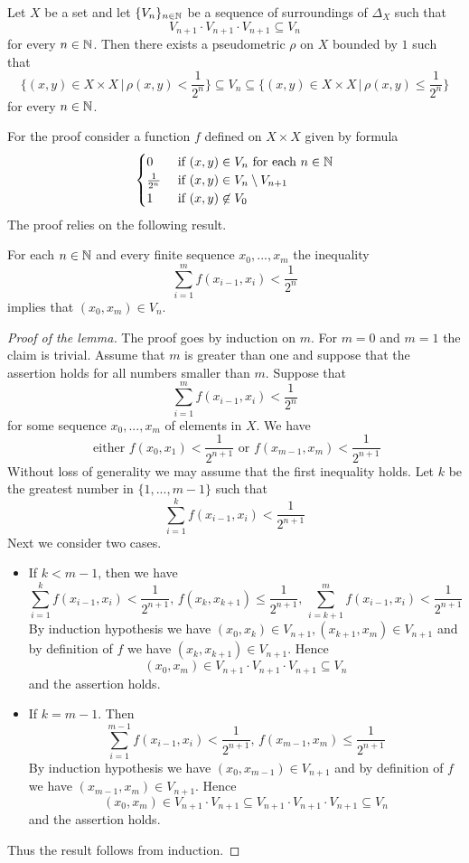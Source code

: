 \begin{theorem}\label{theorem:Weils_theorem_on_pseudometrics}
Let $X$ be a set and let $\{V_n\}_{n\in {\mathbb N}}$ be a sequence of surroundings of $\Delta_X$ such that
$$V_{n+1}\cdot V_{n+1}\cdot V_{n+1} \subseteq V_n$$
for every $n\in {\mathbb N}$. Then there exists a pseudometric $\rho$ on $X$ bounded by $1$ such that
$$\bigg\{(x,y)\in X\times X\,\bigg|\,\rho(x,y)<\frac{1}{2^n}\bigg\} \subseteq V_n \subseteq \bigg\{(x,y)\in X\times X\,\bigg|\,\rho(x,y) \leq \frac{1}{2^n}\bigg\}$$
for every $n\in {\mathbb N}$.
\end{theorem}
\noindent
For the proof consider a function $f$ defined on $X\times X$ given by formula 
$$\begin{cases}
0 & \mbox{ if }(x,y)\in V_n\mbox{ for each }n\in {\mathbb N}\\
\frac{1}{2^n} & \mbox{ if }(x,y)\in V_n\setminus V_{n+1}\\
1 & \mbox{ if }(x,y)\not \in V_0
\end{cases}$$
The proof relies on the following result. 

\begin{lemma}\label{lemma:inclusion_of_surroundings_for_pseudometric}
For each $n \in {\mathbb N}$ and every finite sequence $x_0,...,x_m$ the inequality
$$\sum_{i=1}^mf(x_{i-1},x_i) < \frac{1}{2^n}$$
implies that $(x_0,x_m) \in V_n$.
\end{lemma}
\begin{proof}[Proof of the lemma]
The proof goes by induction on $m$. For $m = 0$ and $m = 1$ the claim is trivial. Assume that $m$ is greater than one and suppose that the assertion holds for all numbers smaller than $m$. Suppose that
$$\sum_{i=1}^mf(x_{i-1},x_i) < \frac{1}{2^n}$$
for some sequence $x_0,...,x_m$ of elements in $X$. We have
$$\mbox{ either }f(x_0,x_1) < \frac{1}{2^{n+1}}\mbox{ or }f(x_{m-1},x_m) < \frac{1}{2^{n+1}}$$
Without loss of generality we may assume that the first inequality holds. Let $k$ be the greatest number in $\{1,...,m-1\}$ such that
$$\sum_{i=1}^kf(x_{i-1},x_i) < \frac{1}{2^{n+1}}$$
Next we consider two cases.
\begin{itemize}
\item If $k < m-1$, then we have
$$\sum_{i=1}^{k}f(x_{i-1},x_i) < \frac{1}{2^{n+1}},\,f(x_k,x_{k+1}) \leq \frac{1}{2^{n+1}},\,\sum_{i=k+1}^mf(x_{i-1},x_i) < \frac{1}{2^{n+1}}$$
By induction hypothesis we have $(x_0,x_k)\in V_{n+1},(x_{k+1},x_m)\in V_{n+1}$ and by definition of $f$ we have $(x_k,x_{k+1})\in V_{n+1}$. Hence
$$(x_0,x_m) \in V_{n+1}\cdot V_{n+1}\cdot V_{n+1}\subseteq V_n$$
and the assertion holds.
\item If $k = m-1$. Then 
$$\sum_{i=1}^{m-1}f(x_{i-1},x_i) < \frac{1}{2^{n+1}},\,f(x_{m-1},x_m)\leq \frac{1}{2^{n+1}}$$
By induction hypothesis we have $(x_0,x_{m-1})\in V_{n+1}$ and by definition of $f$ we have $(x_{m-1},x_{m})\in V_{n+1}$. Hence
$$(x_0,x_{m}) \in V_{n+1}\cdot V_{n+1} \subseteq V_{n+1}\cdot V_{n+1}\cdot V_{n+1} \subseteq V_n$$
and the assertion holds.
\end{itemize}
Thus the result follows from induction.
\end{proof}

